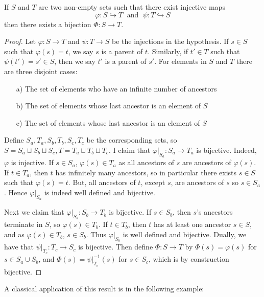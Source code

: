 \begin{subappendices}
    \begin{namthm}
        If $S$ and $T$ are two non-empty sets such that there exist injective maps $$\varphi:S\hookrightarrow T\;\text{ and }\;\psi:T\hookrightarrow S$$ then there exists a bijection $\Phi:S\rightarrow T$.
    \end{namthm}
    \begin{proof}
        Let $\varphi:S\rightarrow T$ and $\psi:T\rightarrow S$ be the injections in the hypothesis. If $s \in S$ such that $\varphi(s) = t$, we say $s$ is a parent of $t$. Similarly, if $t' \in T$ such that $\psi(t') = s' \in S$, then we say $t'$ is a parent of $s'$. For elements in $S$ and $T$ there are three disjoint cases: \begin{itemize}
            \item[a)] The set of elements who have an infinite number of ancestors
            \item[b)] The set of elements whose last ancestor is an element of $S$
            \item[c)] The set of elements whose last ancestor is an element of $S$
        \end{itemize}
        Define $S_a,T_a,S_b,T_b,S_c,T_c$ be the corresponding sets, so $S = S_a\sqcup S_b\sqcup S_c, T = T_a\sqcup T_b\sqcup T_c$. I claim that $\varphi\vert_{S_a}:S_a\rightarrow T_a$ is bijective. Indeed, $\varphi$ is injective. If $s \in S_a$, $\varphi(s) \in T_a$ as all ancestors of $s$ are ancestors of $\varphi(s)$. If $t \in T_a$, then $t$ has infinitely many ancestors, so in particular there exists $s \in S$ such that $\varphi(s) = t$. But, all ancestors of $t$, except $s$, are ancestors of $s$ so $s \in S_a$. Hence $\varphi\vert_{S_a}$ is indeed well defined and bijective. 

        Next we claim that $\varphi\vert_{S_b}:S_b\rightarrow T_b$ is bijective. If $s \in S_b$, then $s$'s ancestors terminate in $S$, so $\varphi(s) \in T_b$. If $t \in T_b$, then $t$ has at least one ancestor $s \in S$, and as $\varphi(s) \in T_b$, $s \in S_b$. Thus $\varphi\vert_{S_b}$ is well defined and bijective. Dually, we have that $\psi\vert_{T_c}:T_c\rightarrow S_c$ is bijective. Then define $\Phi:S\rightarrow T$ by $\Phi(s) = \varphi(s)$ for $s \in S_a\cup S_b$, and $\Phi(s) = \psi\vert_{T_c}^{-1}(s)$ for $s \in S_c$, which is by construction bijective.
    \end{proof}

    A classical application of this result is in the following example:


\end{subappendices}
